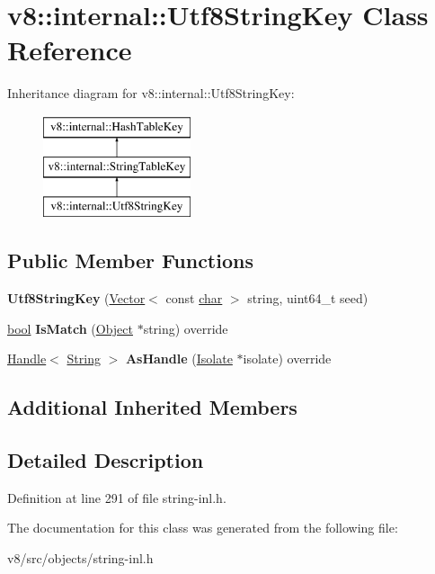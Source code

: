 \hypertarget{classv8_1_1internal_1_1Utf8StringKey}{}\section{v8\+:\+:internal\+:\+:Utf8\+String\+Key Class Reference}
\label{classv8_1_1internal_1_1Utf8StringKey}
Inheritance diagram for v8\+:\+:internal\+:\+:Utf8\+String\+Key\+:\begin{figure}[H]
\begin{center}
\leavevmode
\includegraphics[height=3.000000cm]{classv8_1_1internal_1_1Utf8StringKey}
\end{center}
\end{figure}
\subsection*{Public Member Functions}
\begin{DoxyCompactItemize}
\item 
\mbox{\label{classv8_1_1internal_1_1Utf8StringKey_a5a1697d0e7d4af7bbda884eb698cea16}} 
{\bfseries Utf8\+String\+Key} (\mbox{\hyperlink{classv8_1_1internal_1_1Vector}{Vector}}$<$ const \mbox{\hyperlink{classchar}{char}} $>$ string, uint64\+\_\+t seed)
\item 
\mbox{\label{classv8_1_1internal_1_1Utf8StringKey_a70c6c3c01f05a9f4ce76d3b73d964365}} 
\mbox{\hyperlink{classbool}{bool}} {\bfseries Is\+Match} (\mbox{\hyperlink{classv8_1_1internal_1_1Object}{Object}} $\ast$string) override
\item 
\mbox{\label{classv8_1_1internal_1_1Utf8StringKey_acefaaa78b1304774210f5052b62e7a74}} 
\mbox{\hyperlink{classv8_1_1internal_1_1Handle}{Handle}}$<$ \mbox{\hyperlink{classv8_1_1internal_1_1String}{String}} $>$ {\bfseries As\+Handle} (\mbox{\hyperlink{classv8_1_1internal_1_1Isolate}{Isolate}} $\ast$isolate) override
\end{DoxyCompactItemize}
\subsection*{Additional Inherited Members}


\subsection{Detailed Description}


Definition at line 291 of file string-\/inl.\+h.



The documentation for this class was generated from the following file\+:\begin{DoxyCompactItemize}
\item 
v8/src/objects/string-\/inl.\+h\end{DoxyCompactItemize}
